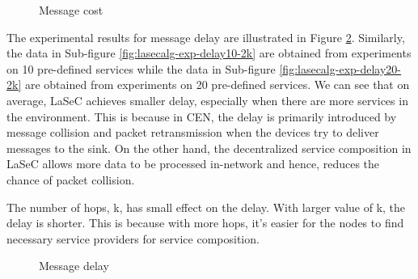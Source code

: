 \begin{figure}
\centering
{}
\caption{Message cost}
\label{fig:lasecalg-exp-cost}
\end{figure}

The experimental results for message delay are illustrated in Figure \ref{fig:lasecalg-exp-delay}. Similarly, the data in Sub-figure \ref{fig:lasecalg-exp-delay10-2k} are obtained from experiments on 10 pre-defined services while the data in Sub-figure \ref{fig:lasecalg-exp-delay20-2k} are obtained from experiments on 20 pre-defined services.  We can see that on average, LaSeC achieves smaller delay, especially when there are more services in the environment. This is because in CEN, the delay is primarily introduced by message collision and packet retransmission when the devices try to deliver messages to the sink. On the other hand, the decentralized service composition in LaSeC allows more data to be processed in-network and hence, reduces the chance of packet collision.

The number of hops, k, has small effect on the delay. With larger value of k, the delay is shorter. This is because with more hops, it's easier for the nodes to find necessary service providers for service composition.

\begin{figure}
\centering
{}
\caption{Message delay}
\label{fig:lasecalg-exp-delay}
\end{figure}